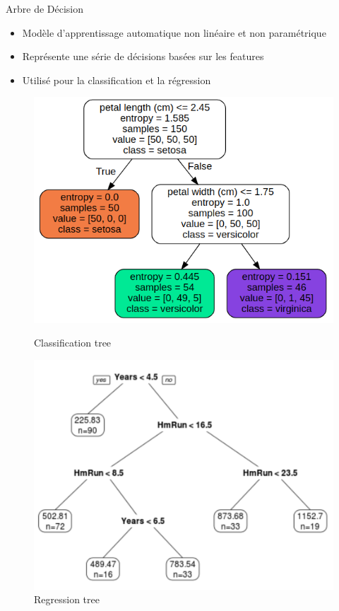 \documentclass{beamer}
\begin{document}
\begin{frame}{Arbre de Décision}
	\begin{itemize}
		\item Modèle d'apprentissage automatique non linéaire et non paramétrique
		\item Représente une série de décisions basées sur les features
		\item Utilisé pour la classification et la régression
	\end{itemize}
	
	\begin{center}
		\begin{figure}
		    \begin{minipage}[t]{0.45\linewidth}
			\centering
			\includegraphics[width=\linewidth]{iris.png}
			\caption{Classification tree}
		\end{minipage}
		\hfill
		\begin{minipage}[t]{0.45\linewidth}
			\centering
			\includegraphics[width=\linewidth]{Rtree3.png}
			\caption{Regression tree}
		\end{minipage}
\end{figure}
\end{center}
\end{frame}
\end{document}
